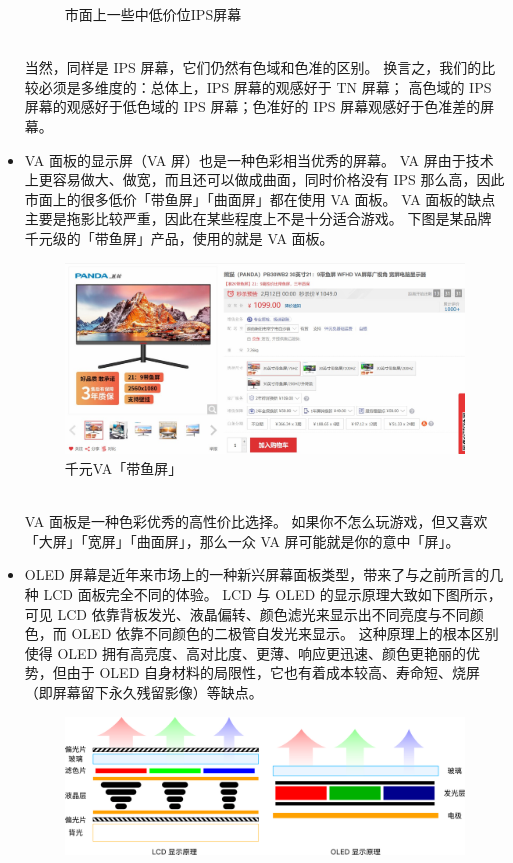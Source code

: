 \begin{itemize}
\begin{figure}[htb!]
      \caption{市面上一些中低价位IPS屏幕}
      \label{IPS_at_Low_Price}
    \end{figure}\\
    当然，同样是 IPS 屏幕，它们仍然有色域和色准的区别。
    换言之，我们的比较必须是多维度的：总体上，IPS 屏幕的观感好于 TN 屏幕；
    高色域的 IPS 屏幕的观感好于低色域的 IPS 屏幕；色准好的 IPS 屏幕观感好于色准差的屏幕。
  \item VA 面板的显示屏（VA 屏）也是一种色彩相当优秀的屏幕。
    VA 屏由于技术上更容易做大、做宽，而且还可以做成曲面，同时价格没有 IPS 那么高，因此市面上的很多低价「带鱼屏」「曲面屏」都在使用 VA 面板。
    VA 面板的缺点主要是拖影比较严重，因此在某些程度上不是十分适合游戏。
    下图是某品牌千元级的「带鱼屏」产品，使用的就是 VA 面板。
    \begin{figure}[htb!]
      \centering
      \includegraphics[width=11cm]{assets/VA_at_Low_Price.jpg}
      \caption{千元VA「带鱼屏」}
      \label{VA_at_Low_Price}
    \end{figure}\\
    VA 面板是一种色彩优秀的高性价比选择。
    如果你不怎么玩游戏，但又喜欢「大屏」「宽屏」「曲面屏」，那么一众 VA 屏可能就是你的意中「屏」。
  \item OLED 屏幕是近年来市场上的一种新兴屏幕面板类型，带来了与之前所言的几种 LCD 面板完全不同的体验。
    LCD 与 OLED 的显示原理大致如下图所示，可见 LCD 依靠背板发光、液晶偏转、颜色滤光来显示出不同亮度与不同颜色，而 OLED 依靠不同颜色的二极管自发光来显示。
    这种原理上的根本区别使得 OLED 拥有高亮度、高对比度、更薄、响应更迅速、颜色更艳丽的优势，但由于 OLED 自身材料的局限性，它也有着成本较高、寿命短、烧屏（即屏幕留下永久残留影像）等缺点。
    \begin{figure}[htb!]
      \centering
      \includegraphics[width=.8\textwidth]{assets/LCD_OLED.png}

\end{figure}
\end{itemize}
